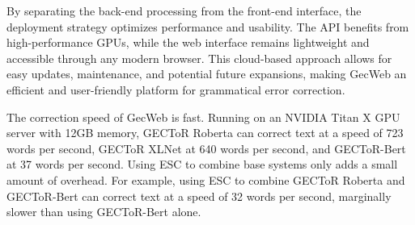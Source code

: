 By separating the back-end processing from the front-end interface, the deployment strategy optimizes performance and usability.
The API benefits from high-performance GPUs, while the web interface remains lightweight and accessible through any modern browser.
This cloud-based approach allows for easy updates, maintenance, and potential future expansions, making GecWeb an efficient and user-friendly platform for grammatical error correction.

The correction speed of GecWeb is fast.
Running on an NVIDIA Titan X GPU server with 12GB memory, GECToR Roberta can correct text at a speed of 723 words per second, GECToR XLNet at 640 words per second, and GECToR-Bert at 37 words per second.
Using ESC to combine base systems only adds a small amount of overhead.
For example, using ESC to combine GECToR Roberta and GECToR-Bert can correct text at a speed of 32 words per second, marginally slower than using GECToR-Bert alone.

